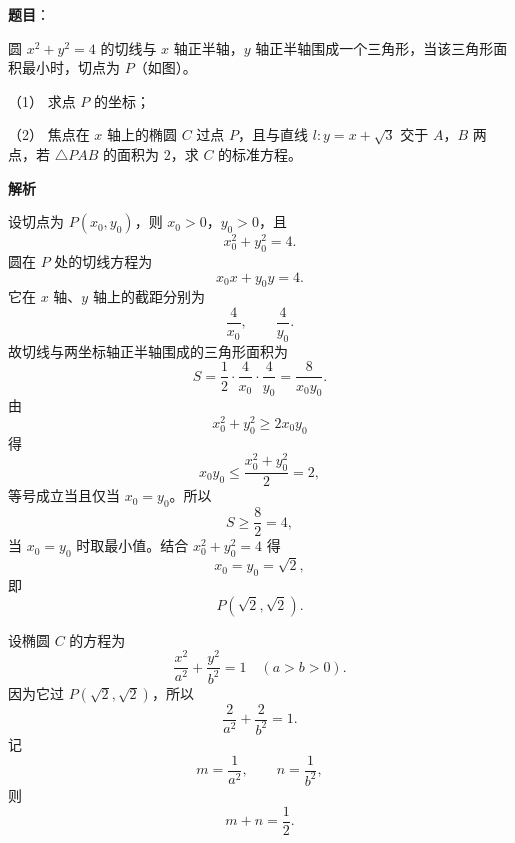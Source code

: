 \begin{answer}

\textbf{题目}：

圆 $x^2+y^2=4$ 的切线与 $x$ 轴正半轴，$y$ 轴正半轴围成一个三角形，当该三角形面积最小时，切点为 $P$（如图）。
\nopagebreak[4]
\begin{center}\end{center}
\nopagebreak[4]
（1） 求点 $P$ 的坐标；

（2） 焦点在 $x$ 轴上的椭圆 $C$ 过点 $P$，且与直线 $l:y=x+\sqrt3$ 交于 $A$，$B$ 两点，若 $\triangle PAB$ 的面积为 $2$，求 $C$ 的标准方程。

\textbf{解析}


设切点为 $P(x_0,y_0)$，则 $x_0>0$，$y_0>0$，且
\nopagebreak[4]
\[x_0^2+y_0^2=4.\]
圆在 $P$ 处的切线方程为
\nopagebreak[4]
\[x_0x+y_0y=4.\]
它在 $x$ 轴、$y$ 轴上的截距分别为
\nopagebreak[4]
\[\frac4{x_0},\qquad\frac4{y_0}.\]
故切线与两坐标轴正半轴围成的三角形面积为
\nopagebreak[4]
\[S=\frac12\cdot\frac4{x_0}\cdot\frac4{y_0}=\frac8{x_0y_0}.\]
由
\nopagebreak[4]
\[x_0^2+y_0^2\geqslant2x_0y_0\]
得
\nopagebreak[4]
\[x_0y_0\leqslant\frac{x_0^2+y_0^2}{2}=2,\]
等号成立当且仅当 $x_0=y_0$。所以
\nopagebreak[4]
\[S\geqslant\frac82=4,\]
当 $x_0=y_0$ 时取最小值。结合 $x_0^2+y_0^2=4$ 得
\nopagebreak[4]
\[x_0=y_0=\sqrt2,\]
即
\nopagebreak[4]
\[P(\sqrt2,\sqrt2).\]


设椭圆 $C$ 的方程为
\nopagebreak[4]
\[\frac{x^2}{a^2}+\frac{y^2}{b^2}=1\quad(a>b>0).\]
因为它过 $P(\sqrt2,\sqrt2)$，所以
\nopagebreak[4]
\[\frac2{a^2}+\frac2{b^2}=1.\]
记
\nopagebreak[4]
\[m=\frac1{a^2},\qquad n=\frac1{b^2},\]
则
\nopagebreak[4]
\[m+n=\frac12.\]


\end{answer}
